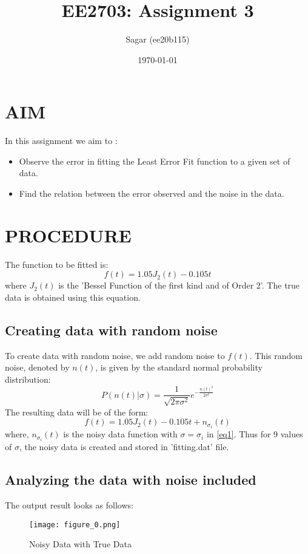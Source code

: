 \documentclass[11pt, a4paper]{article}
\title{EE2703: Assignment 3}
\author{Sagar (ee20b115)}
\date{\today}
\begin{document}
    \maketitle 

    \section{AIM}
        In this assignment we aim to :
        \begin{itemize}
            \item Observe the error in fitting the Least Error Fit function to a given set of data.
            \item Find the relation between the error observed and the noise in the data.
        \end{itemize}
   
    \section{PROCEDURE}
        The function to be fitted is:
        \begin{equation}
            f(t) = 1.05J_2(t)-0.105t
        \end{equation}
        where $J_2(t)$ is the 'Bessel Function of the first kind  and of Order 2'. The true data is obtained using this equation.

        \subsection{Creating data with random noise}
            To create data with random noise, we add random noise to $f(t)$. This random noise, denoted by $n(t)$, is given by the standard normal probability distribution:
            \begin{equation}
                P(n(t)|\sigma)=\frac{1}{\sqrt{2\pi\sigma^2}}e^{-\frac{n(t)^2}{2\sigma^2}} \label{eq1}
            \end{equation}
            The resulting data will be of the form:
            \begin{equation}
                f(t) = 1.05J_2(t)-0.105t+n_{\sigma_i}(t)
            \end{equation}
            where, $n_{\sigma_i}(t)$ is the noisy data function with $\sigma = \sigma_{i}$ in \eqref{eq1}. Thus for 9 values of $\sigma$, the noisy data is created and stored in 'fitting.dat' file.

        \subsection{Analyzing the data with noise included}
            The output result looks as follows:
            \begin{figure}[H]
                \centering
                \texttt{[image: figure\_0.png]}
                \caption{Noisy Data with True Data}
                \label{fig:figure_0}
            \end{figure}
\end{document}
